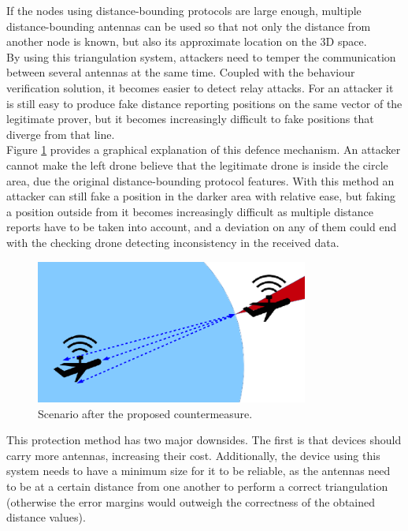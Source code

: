 \documentclass{article}
\begin{document}
If the nodes using distance-bounding protocols are large enough, multiple distance-bounding antennas can be used so that not only the distance from another node is known, but also its approximate location on the 3D space.\\

By using this triangulation system, attackers need to temper the communication between several antennas at the same time. Coupled with the behaviour verification solution, it becomes easier to detect relay attacks. For an attacker it is still easy to produce fake distance reporting positions on the same vector of the legitimate prover, but it becomes increasingly difficult to fake positions that diverge from that line.\\

Figure \ref{fig:attackexample3} provides a graphical explanation of this defence mechanism. An attacker cannot make the left drone believe that the legitimate drone is inside the circle area, due the original distance-bounding protocol features. With this method an attacker can still fake a position in the darker area with relative ease, but faking a position outside from it becomes increasingly difficult as multiple distance reports have to be taken into account, and a deviation on any of them could end with the checking drone detecting inconsistency in the received data.\\

  \begin{figure}[h!]
  \centering
    \includegraphics[width=0.8\textwidth]{images/attack3.png}
  \caption{Scenario after the proposed countermeasure.}
  \label{fig:attackexample3}
\end{figure}

This protection method has two major downsides. The first is that devices should carry more antennas, increasing their cost. Additionally, the device using this system needs to have a minimum size for it to be reliable, as the antennas need to be at a certain distance from one another to perform a correct triangulation (otherwise the error margins would outweigh the correctness of the obtained distance values).\\
\end{document}
